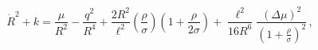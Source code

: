 \begin{equation}
\dot{R}^2+k=\frac{\mu}{R^2}-\frac{q^2}{R^4}+\frac{2R^2}{\ell^2}
\left(\frac{\rho}{\sigma}\right)\left(1+\frac{\rho}{2\sigma}\right)
+\frac{\ell^2}{16 R^6}\frac{(\Delta\mu)^2}{\left(1+\frac{\rho}{\sigma}\right)^2}\,,
\label{asym}\end{equation}

